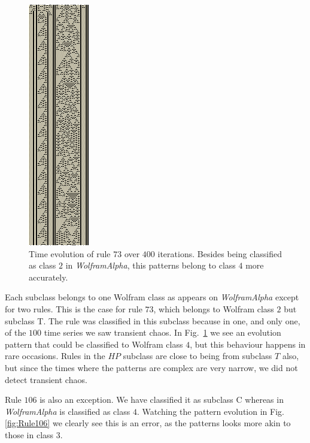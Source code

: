 \begin{figure}
    \centering
    \includegraphics[height=0.95\textheight]{Images/P4/73.png}
    \caption{Time evolution of rule $73$ over $400$ iterations. Besides being classified as class $2$ in \textit{WolframAlpha}, this patterns belong to class $4$ more accurately.}
    \label{fig:Rule73}
\end{figure}





Each subclass belongs to one Wolfram class as appears on \textit{WolframAlpha} except for two rules. This is the case for rule $73$, which belongs to Wolfram class $2$ but subclass T. The rule was classified in this subclass because in one, and only one, of the $100$ time series we saw transient chaos. In Fig.~\ref{fig:Rule73} we see an evolution pattern that could be classified to Wolfram class $4$, but this behaviour happens in rare occasions. Rules in the $HP$ subclass are close to being from subclass $T$ also, but since the times where the patterns are complex are very narrow, we did not detect transient chaos.

Rule $106$ is also an exception. We have classified it as subclass C whereas in \textit{WolframAlpha} is classified as class $4$. Watching the pattern evolution in Fig.\ref{fig:Rule106} we clearly see this is an error, as the patterns looks more akin to those in class $3$.




